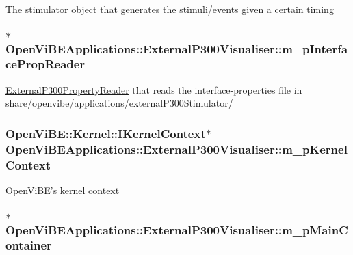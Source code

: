 \label{classOpenViBEApplications_1_1ExternalP300Visualiser_a681ca45d6909f4702eea8b732e5c0267}
The stimulator object that generates the stimuli/events given a certain timing \hypertarget{classOpenViBEApplications_1_1ExternalP300Visualiser_a24c1d41f231682b4527171f3b5ba86d1}{
\subsubsection[{m\_\-pInterfacePropReader}]{$\ast$ {\bf OpenViBEApplications::ExternalP300Visualiser::m\_\-pInterfacePropReader}}}
\label{classOpenViBEApplications_1_1ExternalP300Visualiser_a24c1d41f231682b4527171f3b5ba86d1}
\hyperlink{classOpenViBEApplications_1_1ExternalP300PropertyReader}{ExternalP300PropertyReader} that reads the interface-\/properties file in share/openvibe/applications/externalP300Stimulator/ \hypertarget{classOpenViBEApplications_1_1ExternalP300Visualiser_aaeac05e7590e589f7167aeec97b9712a}{
\subsubsection[{m\_\-pKernelContext}]{\setlength{\rightskip}{0pt plus 5cm}OpenViBE::Kernel::IKernelContext$\ast$ {\bf OpenViBEApplications::ExternalP300Visualiser::m\_\-pKernelContext}}}
\label{classOpenViBEApplications_1_1ExternalP300Visualiser_aaeac05e7590e589f7167aeec97b9712a}
OpenViBE's kernel context \hypertarget{classOpenViBEApplications_1_1ExternalP300Visualiser_a41e13bb1e9208989a27b9d99d620eb01}{
\subsubsection[{m\_\-pMainContainer}]{$\ast$ {\bf OpenViBEApplications::ExternalP300Visualiser::m\_\-pMainContainer}}}
